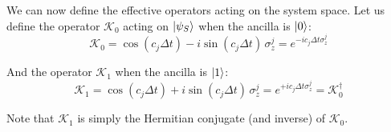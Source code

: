 \documentclass[a4paper,12pt]{article}
\begin{document}
	We can now define the effective operators acting on the system space. Let us define the operator $\mathcal{K}_0$ acting on $\ket{\psi_S}$ when the ancilla is $\ket{0}$:
	\begin{equation}
		\mathcal{K}_0 = \cos{\left( c_j \Delta t \right)} - i \sin{\left( c_j \Delta t \right)} \, \sigma_{z}^{j} = e^{-i c_j \Delta t \sigma_z^j}
		\label{eq:k0_def}
	\end{equation}

	And the operator $\mathcal{K}_1$ when the ancilla is $\ket{1}$:
	\begin{equation}
		\mathcal{K}_1 = \cos{\left( c_j \Delta t \right)} + i \sin{\left( c_j \Delta t \right)} \, \sigma_{z}^{j} = e^{+i c_j \Delta t \sigma_z^j} = \mathcal{K}_0^\dagger
		\label{eq:k1_def}
	\end{equation}

	Note that $\mathcal{K}_1$ is simply the Hermitian conjugate (and inverse) of $\mathcal{K}_0$.
\end{document}
